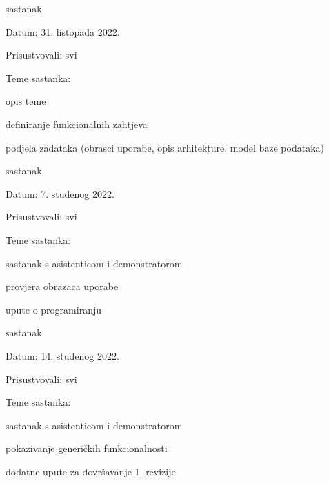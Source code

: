 \begin{packed_enum}
			\item  sastanak
			\item[] \begin{packed_item}
				\item Datum: 31. listopada 2022.
				\item Prisustvovali: svi
				\item Teme sastanka:
				\begin{packed_item}
					\item  opis teme
					\item  definiranje funkcionalnih zahtjeva
					\item podjela zadataka (obrasci uporabe, opis arhitekture, model baze podataka) 
				\end{packed_item}
			\end{packed_item}
		
			\item  sastanak
			\item[] \begin{packed_item}
				\item Datum: 7. studenog 2022.
				\item Prisustvovali: svi
				\item Teme sastanka:
				\begin{packed_item}
					\item  sastanak s asistenticom i demonstratorom
					\item  provjera obrazaca uporabe
					\item  upute o programiranju
				\end{packed_item}
			\end{packed_item}
			
			\item  sastanak
			\item[] \begin{packed_item}
				\item Datum: 14. studenog 2022.
				\item Prisustvovali: svi
				\item Teme sastanka:
				\begin{packed_item}
					\item  sastanak s asistenticom i demonstratorom
					\item  pokazivanje generičkih funkcionalnosti
					\item  dodatne upute za dovršavanje 1. revizije
				\end{packed_item}
			\end{packed_item}
			
		\end{packed_enum}
		
